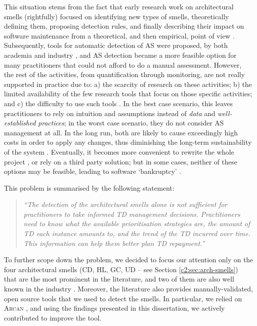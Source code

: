 This situation stems from the fact that early research work on architectural smells (rightfully) focused on identifying new types of smells, theoretically defining them, proposing detection rules, and finally describing their impact on software maintenance from a theoretical, and then empirical, point of view \cite{Lippert2006,Garcia2009,Mo2015,Le2016,Arcelli2016}.
Subsequently, tools for automatic detection of AS were proposed, by both academia and industry \cite{Avgeriou2021,Khomyakov2020}, and AS detection became a more feasible option for many practitioners that could not afford to do a manual assessment.
However, the rest of the activities, from quantification through monitoring, are not really supported in practice due to: a) the scarcity of research on these activities; b) the limited availability of the few research tools that focus on those specific activities; and c) the difficulty to use such tools \cite{Khomyakov2020}.
In the best case scenario, this leaves practitioners to rely on intuition and assumptions instead of \emph{data} and \emph{well-established practices}; in the worst case scenario, they do not consider AS management at all.
In the long run, both are likely to cause exceedingly high costs in order to apply any changes, thus diminishing the long-term sustainability of the system \cite{Winters2020}. 
Eventually, it becomes more convenient to rewrite the whole project \cite{Lehman1979}, or rely on a third party solution; but in some cases, neither of these options may be feasible, leading to software `bankruptcy' \cite{Ampatzoglou2015}.

This problem is summarised by the following statement:
\begin{quote}\itshape
    ``The detection of the architectural smells alone is not sufficient for practitioners to take informed TD management decisions.
    Practitioners need to know what the available prioritisation strategies are, the amount of TD each instance amounts to, and the trend of the TD incurred over time. This information can help them better plan TD repayment.''
\end{quote}

To further scope down the problem, we decided to focus our attention only on the four architectural smells (CD, HL, GC, UD -- see Section \ref{c2:sec:arch-smells}) that are the most prominent in the literature\cite{Azadi2019}, and two of them are also well known in the industry \cite{Lippert2006,Martin2018}.
Moreover, the literature also provides manually-validated, open source tools that we used to detect the smells.
In particular, we relied on \textsc{Arcan} \cite{Arcelli2016,Arcelli2017,Martini2018}, and using the findings presented in this dissertation, we actively contributed to improve the tool.

